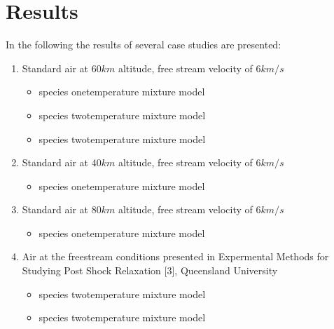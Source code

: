 \documentclass[letterpaper,10pt,english]{jupyterBook}
\begin{document}
\chapter{Results}
\label{\detokenize{Results/Results:results}}\label{\detokenize{Results/Results::doc}}
\sphinxAtStartPar
In the following the results of several case studies are presented:
\begin{enumerate}
%
\item {} 
\sphinxAtStartPar
Standard air at \(60 km\) altitude, free stream velocity of \(6 km/s\)
\begin{itemize}
\item {} 
 species one\sphinxhyphen{}temperature mixture model

\item {} 
 species two\sphinxhyphen{}temperature mixture model

\item {} 
 species two\sphinxhyphen{}temperature mixture model

\end{itemize}

\item {} 
\sphinxAtStartPar
Standard air at \(40 km\) altitude, free stream velocity of \(6 km/s\)
\begin{itemize}
\item {} 
 species one\sphinxhyphen{}temperature mixture model

\end{itemize}

\item {} 
\sphinxAtStartPar
Standard air at \(80 km\) altitude, free stream velocity of \(6 km/s\)
\begin{itemize}
\item {} 
 species one\sphinxhyphen{}temperature mixture model

\end{itemize}

\item {} 
\sphinxAtStartPar
Air at the free\sphinxhyphen{}stream conditions presented in Expermental Methods for Studying Post Shock Relaxation {[}3{]}, Queensland University
\begin{itemize}
\item {} 
 species two\sphinxhyphen{}temperature mixture model

\item {} 
 species two\sphinxhyphen{}temperature mixture model

\end{itemize}

\end{enumerate}
\end{document}
